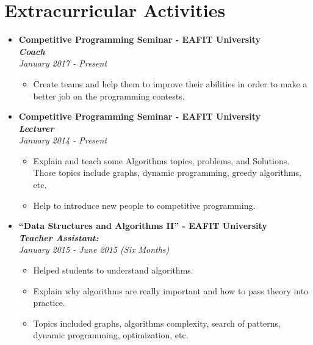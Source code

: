 \documentclass[a4paper,11pt]{article} %
\begin{document}
\section{Extracurricular Activities}
\begin{itemize}
\item \textbf{Competitive Programming Seminar - EAFIT University}\\
\textbf{\emph{Coach}}\\
\emph{January 2017 - Present}
\begin{itemize}
\item Create teams and help them to improve their abilities in order to make a better job on the programming contests.
\end{itemize}
\item \textbf{Competitive Programming Seminar - EAFIT University}\\
\textbf{\emph{Lecturer}}\\
\emph{January 2014 - Present}
\begin{itemize}
\item Explain and teach some Algorithms topics, problems, and Solutions. Those topics include graphs, dynamic programming, greedy algorithms, etc.
\item Help to introduce new people to competitive programming.
\end{itemize}
\item \textbf{``Data Structures and Algorithms II'' - EAFIT University}\\
\textbf{\emph{Teacher Assistant:}}\\
\emph{January 2015 - June 2015 (Six Months)}
\begin{itemize}
\item Helped students to understand algorithms.
\item Explain why algorithms are really important and how to pass theory into practice.
\item Topics included graphs, algorithms complexity, search of patterns, dynamic programming, optimization, etc.
\end{itemize}
\end{itemize}

\iffalse
\section{Achievements}
\begin{itemize}
\item \textbf{Best Graduation Project, Neosistemas 2011}:\\
I won with ``Puzzle'', a Contable Software, based in the problem of a little company.
\item \textbf{Distincted Graduates, Neosistemas, 2011}\\
Distinction with honors among graduates of my year
\end{itemize}
\fi
\end{document}
